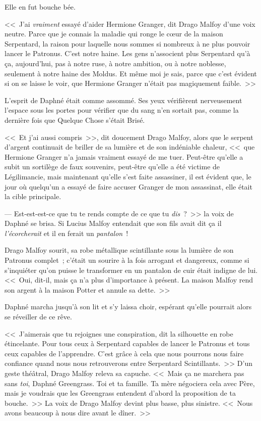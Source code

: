 Elle en fut bouche bée.

<<~J'ai \emph{vraiment} essayé d'aider Hermione Granger, dit Drago Malfoy d'une voix neutre. Parce que je connais la maladie qui ronge le cœur de la maison Serpentard, la raison pour laquelle nous sommes si nombreux à ne plus pouvoir lancer le Patronus. C'est notre haine. Les gens n'associent plus Serpentard qu'à ça, aujourd'hui, pas à notre ruse, à notre ambition, ou à notre noblesse, seulement à notre haine des Moldus. Et même moi je sais, parce que c'est évident si on se laisse le voir, que Hermione Granger n'était pas magiquement faible.~>>

L'esprit de Daphné était comme assommé. Ses yeux vérifièrent nerveusement l'espace sous les portes pour vérifier que du sang n'en sortait pas, comme la dernière fois que Quelque Chose s'était Brisé.

<<~Et j'ai aussi compris~>>, dit doucement Drago Malfoy, alors que le serpent d'argent continuait de briller de sa lumière et de son indéniable chaleur, <<~que Hermione Granger n'a jamais vraiment essayé de me tuer. Peut-être qu'elle a subit un sortilège de faux souvenirs, peut-être qu'elle a été victime de Légilimancie, mais maintenant qu'elle s'est faite assassiner, il est évident que, le jour où quelqu'un a essayé de faire accuser Granger de mon assassinat, elle était la cible principale.

--- Est-est-est-ce que tu te rends compte de ce que tu \emph{dis}~?~>> la voix de Daphné se brisa. Si Lucius Malfoy entendait que son fils avait dit ça il \emph{l'écorcherait} et il en ferait un \emph{pantalon}~!

Drago Malfoy sourit, sa robe métallique scintillante sous la lumière de son Patronus complet~; c'était un sourire à la fois arrogant et dangereux, comme si s'inquiéter qu'on puisse le transformer en un pantalon de cuir était indigne de lui. <<~Oui, dit-il, mais ça n'a plus d'importance à présent. La maison Malfoy rend son argent à la maison Potter et annule sa dette.~>>

Daphné marcha jusqu'à son lit et s'y laissa choir, espérant qu'elle pourrait alors se réveiller de ce rêve.

<<~J'aimerais que tu rejoignes une conspiration, dit la silhouette en robe étincelante. Pour tous ceux à Serpentard capables de lancer le Patronus et tous ceux capables de l'apprendre. C'est grâce à cela que nous pourrons nous faire confiance quand nous nous retrouverons entre Serpentard Scintillants.~>> D'un geste théâtral, Drago Malfoy releva sa capuche. <<~Mais ça ne marchera pas sans \emph{toi}, Daphné Greengrass. Toi et ta famille. Ta mère négociera cela avec Père, mais je voudrais que les Greengrass entendent d'abord la proposition de ta bouche.~>> La voix de Drago Malfoy devint plus basse, plus sinistre. <<~Nous avons beaucoup à nous dire avant le dîner.~>>

